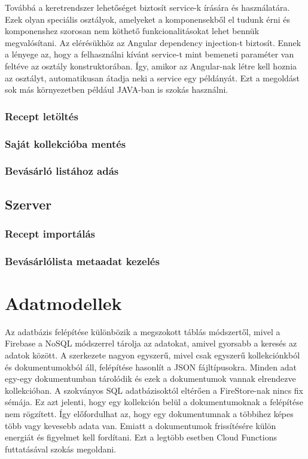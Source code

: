 \documentclass[12pt]{report}
\theoremstyle{definition}
\begin{document}
Továbbá a keretrendszer lehetőséget biztosít service-k írására és használatára. Ezek olyan speciális osztályok, amelyeket a komponensekből el tudunk érni és komponenshez szorosan nem köthető funkcionalitásokat lehet bennük megvalósítani. Az elérésükhöz az Angular dependency injection-t biztosít. Ennek a lényege az, hogy a felhasználni kívánt service-t mint bemeneti paraméter van feltéve az osztály konstruktorában. Így, amikor az Angular-nak létre kell hoznia az osztályt, automatikusan átadja neki a service egy példányát.  Ezt a megoldást sok más környezetben például JAVA-ban is szokás használni.

\subsection{Recept letöltés}

\subsection{Saját kollekcióba mentés}

\subsection{Bevásárló listához adás}

\section{Szerver}

\subsection{Recept importálás}

\subsection{Bevásárlólista metaadat kezelés}

\chapter{Adatmodellek}
\label{dataSchemes}
Az adatbázis felépítése különbözik a megszokott táblás módszertől, mivel a Firebase a NoSQL módszerrel tárolja az adatokat, amivel gyorsabb a keresés az adatok között. A szerkezete nagyon egyszerű, mivel csak egyszerű kollekciónkból és dokumentumokból áll, felépítése hasonlít a JSON fájltípusokra. Minden adat egy-egy dokumentumban tárolódik és ezek a dokumentumok vannak elrendezve kollekcióban. A szokványos SQL adatbázisoktól eltérően a FireStore-nak nincs fix sémája. Ez azt jelenti, hogy egy kollekción belül a dokumentumoknak a felépítése nem rögzített. Így előfordulhat az, hogy egy dokumentumnak a többihez képes több vagy kevesebb adata van. Emiatt a dokumentumok frissítésére külön energiát és figyelmet kell fordítani. Ezt a legtöbb esetben Cloud Functions futtatásával szokás megoldani.
\end{document}

